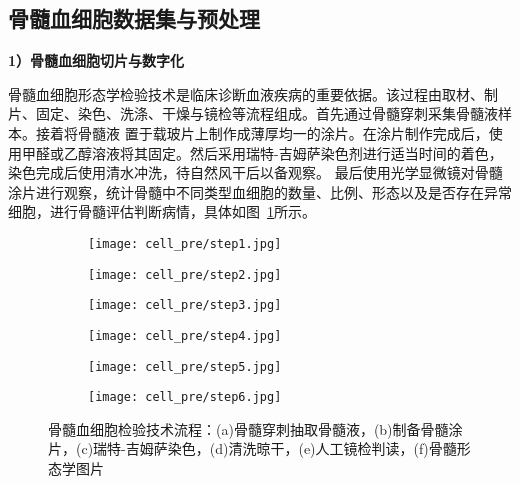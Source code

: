 \subsection{骨髓血细胞数据集与预处理}

\textbf{1）骨髓血细胞切片与数字化}

骨髓血细胞形态学检验技术是临床诊断血液疾病的重要依据。该过程由取材、制片、固定、染色、洗涤、干燥与镜检等流程组成。首先通过骨髓穿刺采集骨髓液样本。接着将骨髓液
置于载玻片上制作成薄厚均一的涂片。在涂片制作完成后，使用甲醛或乙醇溶液将其固定。然后采用瑞特-吉姆萨染色剂进行适当时间的着色，染色完成后使用清水冲洗，待自然风干后以备观察。
最后使用光学显微镜对骨髓涂片进行观察，统计骨髓中不同类型血细胞的数量、比例、形态以及是否存在异常细胞，进行骨髓评估判断病情，具体如图~\ref{fig:cell_pre}所示。

\begin{figure}[htbp]
	\centering
	\begin{subfigure}{0.325\linewidth}
		\centering
		\texttt{[image: cell\_pre/step1.jpg]}
    \caption{}
	\end{subfigure}
	\centering
	\begin{subfigure}{0.325\linewidth}
		\centering
		\texttt{[image: cell\_pre/step2.jpg]}
    \caption{}
	\end{subfigure}
	\centering
	\begin{subfigure}{0.325\linewidth}
		\centering
		\texttt{[image: cell\_pre/step3.jpg]}
    \caption{}
	\end{subfigure}

	\centering
	\begin{subfigure}{0.325\linewidth}
		\centering
		\texttt{[image: cell\_pre/step4.jpg]}
    \caption{}
	\end{subfigure}
	\centering
	\begin{subfigure}{0.325\linewidth}
		\centering
		\texttt{[image: cell\_pre/step5.jpg]}
    \caption{}
	\end{subfigure}
	\centering
	\begin{subfigure}{0.325\linewidth}
		\centering
		\texttt{[image: cell\_pre/step6.jpg]}
    \caption{}
	\end{subfigure}
	\caption{骨髓血细胞检验技术流程：(a)骨髓穿刺抽取骨髓液，(b)制备骨髓涂片，(c)瑞特-吉姆萨染色，(d)清洗晾干，(e)人工镜检判读，(f)骨髓形态学图片}
	\label{fig:cell_pre}
\end{figure}

